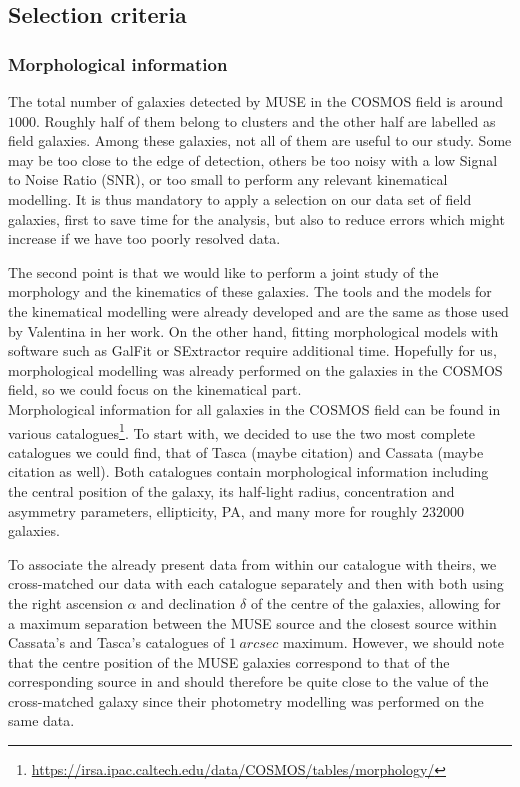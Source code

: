 \subsection{Selection criteria}

\subsubsection{Morphological information}

The total number of galaxies detected by MUSE in the COSMOS field is around $1000$. Roughly half of them belong to clusters and the other half are labelled as field galaxies. Among these galaxies, not all of them are useful to our study. Some may be too close to the edge of detection, others be too noisy with a low Signal to Noise Ratio (SNR), or too small to perform any relevant kinematical modelling. It is thus mandatory to apply a selection on our data set of field galaxies, first to save time for the analysis, but also to reduce errors which might increase if we have too poorly resolved data.

The second point is that we would like to perform a joint study of the morphology and the kinematics of these galaxies. The tools and the models for the kinematical modelling were already developed and are the same as those used by Valentina in her work. On the other hand, fitting morphological models with software such as GalFit or SExtractor require additional time. Hopefully for us, morphological modelling was already performed on the galaxies in the COSMOS field, so we could focus on the kinematical part. \\

Morphological information for all galaxies in the COSMOS field can be found in various catalogues\footnote{\url{https://irsa.ipac.caltech.edu/data/COSMOS/tables/morphology/}}. To start with, we decided to use the two most complete catalogues we could find, that of Tasca (maybe citation) and Cassata (maybe citation as well). Both catalogues contain morphological information including the central position of the galaxy, its half-light radius, concentration and asymmetry parameters, ellipticity, PA, and many more for roughly $232 000$ galaxies. 

To associate the already present data from  within our catalogue with theirs, we cross-matched our data with each catalogue separately and then with both using the right ascension $\alpha$ and declination $\delta$ of the centre of the galaxies, allowing for a maximum separation between the MUSE source and the closest source within Cassata's and Tasca's catalogues of $\SI{1}{arcsec}$ maximum. However, we should note that the centre position of the MUSE galaxies correspond to that of the corresponding source in  and should therefore be quite close to the value of the cross-matched galaxy since their photometry modelling was performed on the same data. \\

